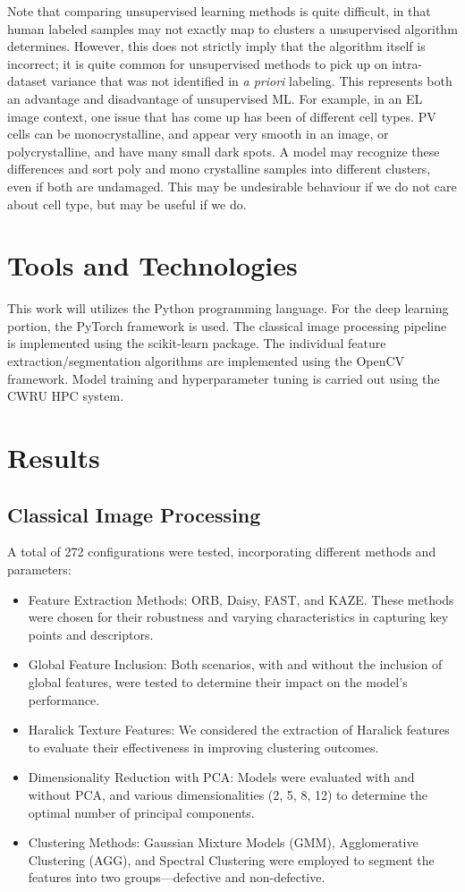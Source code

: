 \documentclass[conference]{IEEEtran}
\begin{document}
Note that comparing unsupervised learning methods is quite difficult, in that human labeled samples may not exactly map to clusters a unsupervised algorithm determines. 
However, this does not strictly imply that the algorithm itself is incorrect; it is quite common for unsupervised methods to pick up on intra-dataset variance that was not identified in \textit{a priori} labeling. 
This represents both an advantage and disadvantage of unsupervised ML. 
For example, in an EL image context, one issue that has come up has been of different cell types. 
PV cells can be monocrystalline, and appear very smooth in an image, or polycrystalline, and have many small dark spots. 
A model may recognize these differences and sort poly and mono crystalline samples into different clusters, even if both are undamaged. 
This may be undesirable behaviour if we do not care about cell type, but may be useful if we do. 

\section{Tools and Technologies}
This work will utilizes the Python programming language. 
For the deep learning portion, the PyTorch framework is used. 
The classical image processing pipeline is implemented using the scikit-learn package. 
The individual feature extraction/segmentation algorithms are implemented using the OpenCV framework.
Model training and hyperparameter tuning is carried out using the CWRU HPC system.  

\section{Results}
\subsection{Classical Image Processing}
A total of 272 configurations were tested, incorporating different methods and parameters:
\begin{itemize}
    \item Feature Extraction Methods: ORB, Daisy, FAST, and KAZE. These methods were chosen for their robustness and varying characteristics in capturing key points and descriptors.
    \item Global Feature Inclusion: Both scenarios, with and without the inclusion of global features, were tested to determine their impact on the model's performance.
    \item Haralick Texture Features: We considered the extraction of Haralick features to evaluate their effectiveness in improving clustering outcomes.
    \item Dimensionality Reduction with PCA: Models were evaluated with and without PCA, and various dimensionalities (2, 5, 8, 12) to determine the optimal number of principal components.
    \item Clustering Methods: Gaussian Mixture Models (GMM), Agglomerative Clustering (AGG), and Spectral Clustering were employed to segment the features into two groups---defective and non-defective.
\end{itemize}
\end{document}

